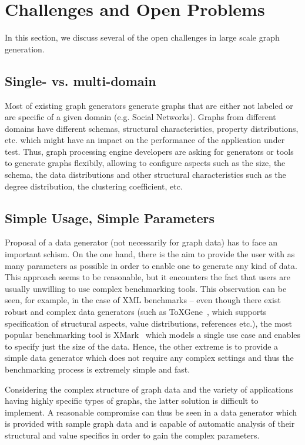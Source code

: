 \section{Challenges and Open Problems}
\label{sec:challenges}

In this section, we discuss several of the open challenges in large scale graph
generation. 

\subsection{Single- vs. multi-domain}

Most of existing graph generators generate graphs that are either not labeled or
are specific of a given domain (e.g.  Social Networks). Graphs from different
domains have different schemas, structural characteristics, property
distributions, etc. which might have an impact on the performance of the
application under test. Thus, graph processing engine developers are asking for
generators or tools to generate graphs flexibily, allowing to configure aspects
such as the size, the schema, the data distributions and other structural
characteristics such as the degree distribution, the clustering coefficient,
etc.


\subsection{Simple Usage, Simple Parameters}
Proposal of a data generator (not necessarily for graph data) has to face an
important schism. On the one hand, there is the aim to provide the user with as
many parameters as possible in order to enable one to generate any kind of data.
This approach seems to be reasonable, but it encounters the fact that users are
usually unwilling to use complex benchmarking tools. This observation can be
seen, for example, in the case of XML benchmarks -- even though there exist
robust and complex data generators (such as
ToXGene~\cite{conf/webdb/BarbosaMKL02}, which supports specification of
structural aspects, value distributions, references etc.), the most popular
benchmarking tool is XMark~\cite{Schmidt:2002:XBX:1287369.1287455} which models
a single use case and enables to specify just the size of the data. Hence, the
other extreme is to provide a simple data generator which does not require any
complex settings and thus the benchmarking process is extremely simple and fast.

Considering the complex structure of graph data and the variety of applications
having highly specific types of graphs, the latter solution is difficult to
implement. A reasonable compromise can thus be seen in a data generator which is
provided with sample graph data and is capable of automatic analysis of their
structural and value specifics in order to gain the complex parameters.

